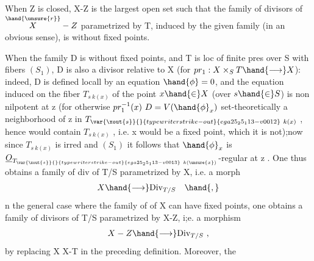 
 When Z is closed, X-Z is the largest open set
such that the family of divisors of $\overset{\hand{\unsure{r}}}{X}-Z$ parametrized by T, induced by the
given family (in an obvious sense), is without fixed points.

When the family D is without fixed points, and T is  loc of finite pres
over S with fibers $(S_1)$, D is also a  divisor
relative to X (for $pr_1 : X\times_S T \hand{\longrightarrow} X$): indeed, D is defined locall
 by an equation  $\hand{\phi} = 0$, and the equation induced on the fiber
$T_{s\ k(x)}$ of the point $x\hand{\in} X$ (over $s\hand{\in} S$) is non 
nilpotent at z (for otherwise $pr_1^{-1}(x)\ D = V(\hand{\phi}_x)$   set-theoretically
a neighborhood of z in $T_{\var{\xout{s}}{}{typewriter strike-out}{ega25_25_113-v0012}\ k(x)}$ , hence would contain $T_{s\ k(x)}$ , i.e.
x would be a fixed point, which it is not);now since $T_{s\ k(x)}$ is irred and $(S_1)$
it follows that $\hand{\phi}_x$ is $\underline{O}_{T_{\var{\xout{s}}{}{typewriter strike-out}{ega25_25_113-v0013}\ k(\unsure{x})}}$-regular at z . One thus obtains
 a family of div of T/S parametrized by X, i.e. a morph
\[ X \hand{\longrightarrow} \mathrm{Div}_{T/S} \quad \hand{,} \]
n the general case where the family of  of X can have fixed
points, one obtains a family of divisors of T/S parametrized by X-Z,
i;e. a morphism
\[ X - Z \hand{\longrightarrow} \mathrm{Div}_{T/S} \ , \]
by replacing X  X-T in the preceding definition. Moreover, the

